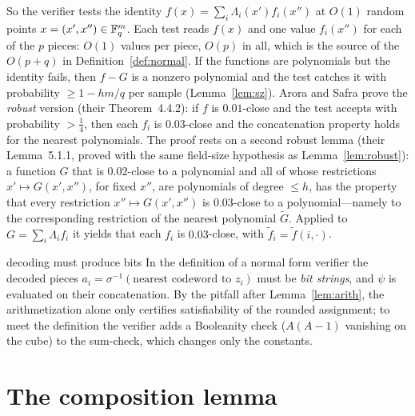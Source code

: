 \noindent
So the verifier tests the identity $f(x)=\sum_i\Lambda_i(x')f_i(x'')$ at $O(1)$ random points $x=(x',x'')\in\mathbb{F}_q^m$.  Each test reads $f(x)$ and one value $f_i(x'')$ for each of the $p$ pieces: $O(1)$ values per piece, $O(p)$ in all,
which is the source of the $O(p+q)$ in Definition~\ref{def:normal}.  If the functions are polynomials but the identity fails, then $f-G$ is a nonzero polynomial and the test catches it with probability $\ge1-hm/q$ per sample (Lemma~\ref{lem:sz}).
Arora and Safra prove the \emph{robust} version (their Theorem~4.4.2): if $f$ is $0.01$-close and the test accepts with probability $>\tfrac14$, then each $f_i$ is $0.03$-close and the concatenation property holds for the nearest polynomials.
The proof rests on a second robust lemma (their Lemma~5.1.1, proved with the same field-size hypothesis as Lemma~\ref{lem:robust}): a function $G$ that is $0.02$-close to a polynomial and all of whose
restrictions $x'\mapsto G(x',x'')$, for fixed $x''$, are polynomials of degree $\le h$, has the property that every restriction $x''\mapsto G(x',x'')$ is $0.03$-close to a polynomial---namely to the corresponding
restriction of the nearest polynomial $\tilde G$.  Applied to $G=\sum_i\Lambda_if_i$ it yields that each $f_i$ is $0.03$-close, with $\tilde f_i=\tilde f(i,\cdot)$.

\begin{pitfall}{decoding must produce bits}
In the definition of a normal form verifier the decoded pieces $a_i=\sigma^{-1}(\text{nearest codeword to }z_i)$ must be \emph{bit strings}, and $\psi$ is evaluated on their concatenation.
By the pitfall after Lemma~\ref{lem:arith}, the arithmetization alone only certifies satisfiability of the rounded assignment; to meet the definition the verifier adds a Booleanity check
($A(A-1)$ vanishing on the cube) to the sum-check, which changes only the constants.
\end{pitfall}


\section{The composition lemma}
\label{sec:compose}


